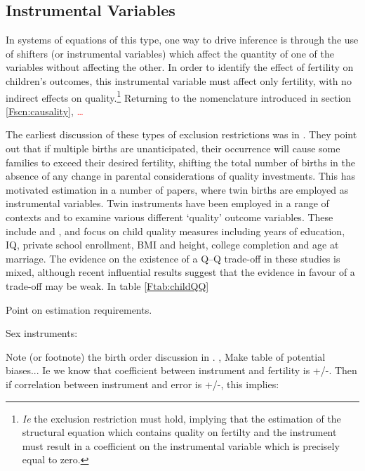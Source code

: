 \subsection{Instrumental Variables}
In systems of equations of this type, one way to drive inference is through the
use of shifters (or instrumental variables) which affect the quantity of one of
the variables without affecting the other.  In order to identify the effect of 
fertility on children's outcomes, this instrumental variable must affect only 
fertility, with no indirect effects on quality.\footnote{\emph{Ie} the exclusion 
restriction must hold, implying that the estimation of the structural equation 
which contains quality on fertilty and the instrument must result in a 
coefficient on the instrumental variable which is precisely equal to zero.}
Returning to the nomenclature introduced in section \ref{Fscn:causality},
\textcolor{red}{\ldots}

The earliest discussion of these types of exclusion restrictions was in 
\citet{RosenzweigWolpin1980}. They point out that if multiple births are 
unanticipated, their occurrence will cause some families to exceed their desired
fertility, shifting the total number of births in the absence of any change in 
parental considerations of quality investments.  This has motivated estimation 
in a number of papers, where twin births are employed as instrumental 
variables.  Twin instruments have been employed in a range of contexts and
to examine various different `quality' outcome variables.  These include
\citet{Blacketal2005,Caceres2006,Lietal2008,Dayiogluetal2009,Sanhueza2009,
Blacketal2010,Angristetal2010,FitzsimonsMalde2010} and 
\citet{SouzaPonczek2012}, and focus on child quality measures including years of 
education, IQ, private school enrollment, BMI and height, college completion and 
age at marriage.  The evidence on the existence of a Q--Q trade-off in these 
studies is mixed, although recent influential results suggest that the evidence 
in favour of a trade-off may be weak.  In table \ref{Ftab:childQQ}

Point on estimation requirements.

Sex instruments: \citet{ConleyGlauber2006,Lee2008,Angristetal2010,KumarKugler2011,
FitzsimonsMalde2014}

\citet{Beckeretal2010,MillimetWang2011,Lee2008}
Note (or footnote) the birth order discussion in \citet{Blacketal2005}.
\citet{Bougmaetal2015},
Make table of potential biases...  Ie we know that coefficient between 
instrument and fertility is +/-.  Then if correlation between instrument
and error is +/-, this implies:

